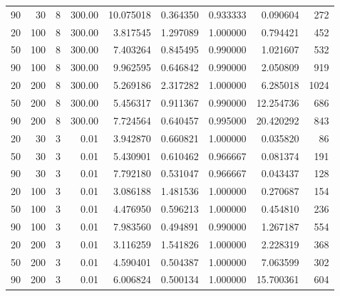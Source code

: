 \begin{tabular}{rrrrrrrrr}
90 &  30 &  8 &  300.00 & 10.075018 &  0.364350 & 0.933333 &  0.090604 &    272 \\
20 & 100 &  8 &  300.00 &  3.817545 &  1.297089 & 1.000000 &  0.794421 &    452 \\
50 & 100 &  8 &  300.00 &  7.403264 &  0.845495 & 0.990000 &  1.021607 &    532 \\
90 & 100 &  8 &  300.00 &  9.962595 &  0.646842 & 0.990000 &  2.050809 &    919 \\
20 & 200 &  8 &  300.00 &  5.269186 &  2.317282 & 1.000000 &  6.285018 &   1024 \\
50 & 200 &  8 &  300.00 &  5.456317 &  0.911367 & 0.990000 & 12.254736 &    686 \\
90 & 200 &  8 &  300.00 &  7.724564 &  0.640457 & 0.995000 & 20.420292 &    843 \\
20 &  30 &  3 &    0.01 &  3.942870 &  0.660821 & 1.000000 &  0.035820 &     86 \\
50 &  30 &  3 &    0.01 &  5.430901 &  0.610462 & 0.966667 &  0.081374 &    191 \\
90 &  30 &  3 &    0.01 &  7.792180 &  0.531047 & 0.966667 &  0.043437 &    128 \\
20 & 100 &  3 &    0.01 &  3.086188 &  1.481536 & 1.000000 &  0.270687 &    154 \\
50 & 100 &  3 &    0.01 &  4.476950 &  0.596213 & 1.000000 &  0.454810 &    236 \\
90 & 100 &  3 &    0.01 &  7.983560 &  0.494891 & 0.990000 &  1.267187 &    554 \\
20 & 200 &  3 &    0.01 &  3.116259 &  1.541826 & 1.000000 &  2.228319 &    368 \\
50 & 200 &  3 &    0.01 &  4.590401 &  0.504387 & 1.000000 &  7.063599 &    302 \\
90 & 200 &  3 &    0.01 &  6.006824 &  0.500134 & 1.000000 & 15.700361 &    604 \\
\bottomrule
\end{tabular}
